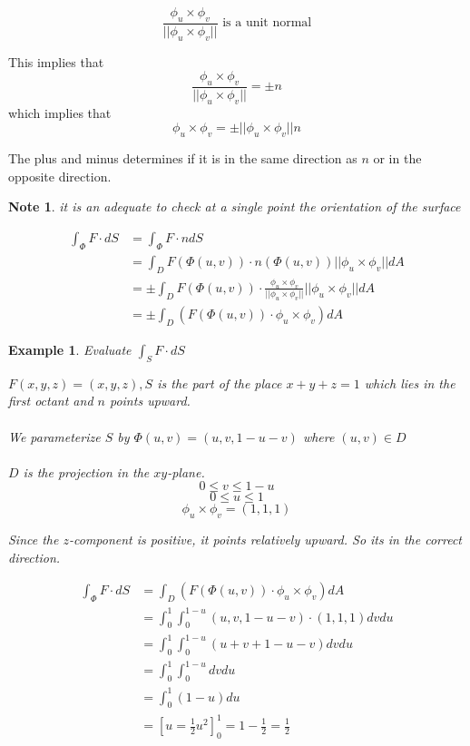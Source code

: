 \documentclass[12pt]{article}
\theoremstyle{plain}
\newtheorem*{note}{Note}
\newtheorem{example}[theorem]{Example}
\theoremstyle{definition}
\begin{document}
$$\frac{\phi_u \times \phi_v}{||\phi_u \times \phi_v||} \text{ is a unit normal}$$

This implies that
$$\frac{\phi_u \times \phi_v}{||\phi_u \times \phi_v||} = \pm n$$
which implies that
$$\phi_u \times \phi_v = \pm || \phi_u \times \phi_v|| n$$

The plus and minus determines if it is in the same direction as $n$ or in the opposite direction.

\begin{note}
	it is an adequate to check at a single point the orientation of the surface
\end{note}


\begin{align*}
	\int_\Phi F \cdot dS &= \int_\Phi F \cdot n dS\\
	&= \int_D F (\Phi (u,v)) \cdot n (\Phi(u,v)) || \phi_u \times \phi_v|| dA\\
	&= \pm \int_D F (\Phi (u,v)) \cdot \frac{\phi_u \times \phi_v}{||\phi_u \times \phi_v||} ||\phi_u \times \phi_v|| dA\\
	&= \pm \int_D (F(\Phi (u,v)) \cdot \phi_u \times \phi_v) dA
\end{align*}

\begin{example}
	Evaluate $\int_S F \cdot dS$

	$F(x,y,z) = (x,y,z), S$ is the part of the place $x+y+z=1$ which lies in the first octant and $n$ points upward.\\
	\\
	We parameterize $S$ by $\Phi (u,v) = (u,v, 1-u-v)$ where $(u,v)\in D$\\
	\\
	$D$ is the projection in the $xy$-plane.
	$$0 \leq v \leq 1-u$$
	$$0 \leq u \leq 1$$
	$$\phi_u \times \phi_v = (1,1,1)$$

	Since the $z$-component is positive, it points relatively upward. So its in the correct direction.

	\begin{align*}
		\int_\Phi F \cdot dS &= \int_D (F(\Phi (u,v)) \cdot \phi_u \times \phi_v) dA\\
		&= \int_0^1 \int_0^{1-u} (u,v,1-u-v) \cdot (1,1,1) dv du\\
		&= \int_0^1 \int_0^{1-u} (u+v+1-u-v) dv du\\
		&=\int_0^1 \int_0^{1-u} dv du\\
		&= \int_0^1 (1-u) du\\
		&= [u=\frac{1}{2}u^2]_0^1 = 1 - \frac{1}{2} = \frac{1}{2}
	\end{align*}



\end{example}
\end{document}
